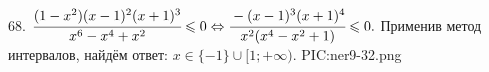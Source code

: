 68. $\cfrac{(1-x^2)(x-1)^2(x+1)^3}{x^6-x^4+x^2}\leqslant0\Leftrightarrow\cfrac{-(x-1)^3(x+1)^4}{x^2(x^4-x^2+1)}\leqslant0.$ Применив метод интервалов, найдём ответ: $x\in\{-1\}\cup[1;+\infty).$
{{PIC:ner9-32.png}}\\
